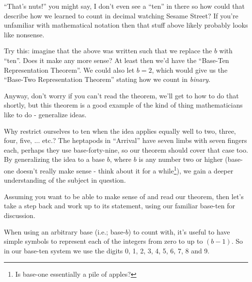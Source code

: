 \documentclass{article}
\begin{document}
``That's nuts!'' you might say, I don't even see a ``ten'' in there so how could that
describe how we learned to count in decimal watching Sesame Street? 
If you're unfamiliar with mathematical notation then that stuff above likely probably looks
like nonsense.

Try this: imagine that the above was 
written such that
we replace the $b$ with ``ten''. Does it make any more sense?
At least then we'd have the ``Base-Ten Representation Theorem''. We could also let $b=2$,
which would give us the 
``Base-Two Representation Theorem'' stating how we count in \emph{binary}.

Anyway, don't worry if you can't read the theorem, we'll get to how to do that shortly, but
this theorem is a good example of the kind of thing mathematicians like to do - generalize ideas.

Why restrict ourselves to ten when the idea applies equally well to two, three, four, five, ... etc.?
The heptapods in ``Arrival'' have  seven limbs with seven fingers each, perhaps they
use base-forty-nine, so our
theorem should cover that case too.  By generalizing the idea to a base $b$,
where $b$ is any number two or higher (base-one doesn't really make sense
- think about it for a while\footnote{Is base-one essentially a pile of apples?}),
we gain a deeper understanding of the subject in question.



Assuming you want to be able to make sense of and read our theorem, then let's take a step
back and work up to its statement,
using our familiar base-ten for discussion.

When using an arbitrary base (i.e.; base-$b$) to count with,
it's useful to have simple symbols to represent each of the integers from zero to up to $(b-1)$.
So in our base-ten system we use the
digits 0, 1, 2, 3, 4, 5, 6, 7, 8 and 9.
\end{document}
